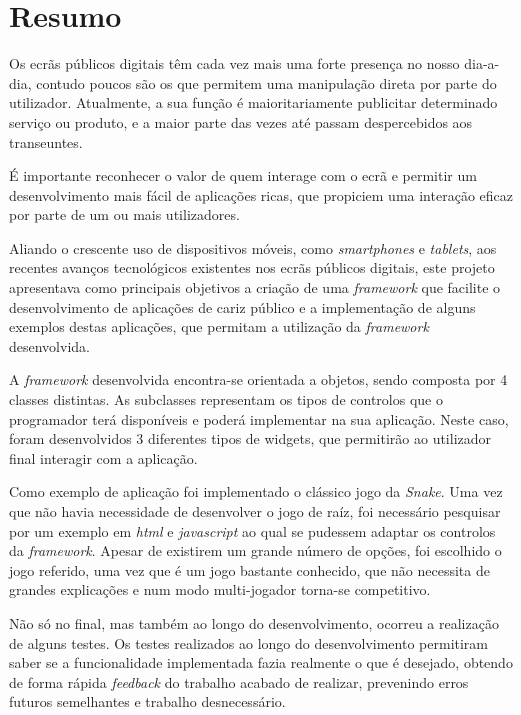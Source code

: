 \chapter*{Resumo}

Os ecrãs públicos digitais têm cada vez mais uma forte presença no nosso dia-a-dia, contudo poucos são os que permitem uma manipulação direta por parte do utilizador. Atualmente, a sua função é maioritariamente publicitar determinado serviço ou produto, e a maior parte das vezes até passam despercebidos aos transeuntes.

É importante reconhecer o valor de quem interage com o ecrã e permitir um desenvolvimento mais fácil de aplicações ricas, que propiciem uma interação eficaz por parte de um ou mais utilizadores. 

Aliando o crescente uso de dispositivos móveis, como \textit{smartphones} e \textit{tablets}, aos recentes avanços tecnológicos existentes nos ecrãs públicos digitais, este projeto apresentava como principais objetivos a criação de uma \textit{framework} que facilite o desenvolvimento de aplicações de cariz público e a implementação de alguns exemplos destas aplicações, que permitam a utilização da \textit{framework} desenvolvida.

A \textit{framework} desenvolvida encontra-se orientada a objetos, sendo composta por 4 classes distintas. As subclasses representam os tipos de controlos que o programador terá disponíveis e poderá implementar na sua aplicação. Neste caso, foram desenvolvidos 3 diferentes tipos de widgets, que permitirão ao utilizador final interagir com a aplicação.

Como exemplo de aplicação foi implementado o clássico jogo da \textit{Snake}. Uma vez que não havia necessidade de desenvolver o jogo de raíz, foi necessário pesquisar por um exemplo em \textit{html} e \textit{javascript} ao qual se pudessem adaptar os controlos da \textit{framework}. Apesar de existirem um grande número de opções, foi escolhido o jogo referido, uma vez que é um jogo bastante conhecido, que não necessita de grandes explicações e num modo multi-jogador torna-se competitivo.

Não só no final, mas também ao longo do desenvolvimento, ocorreu a realização de alguns testes. Os testes realizados ao longo do desenvolvimento permitiram saber se a funcionalidade implementada fazia realmente o que é desejado, obtendo de forma rápida \textit{feedback} do trabalho acabado de realizar, prevenindo erros futuros semelhantes e trabalho desnecessário. 

